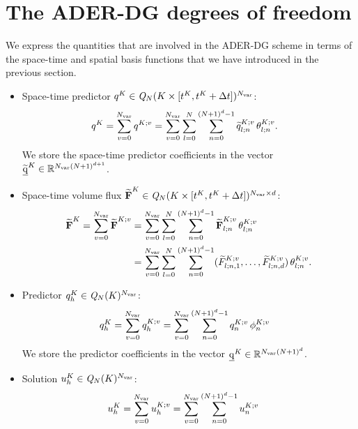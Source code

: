 \documentclass{scrreprt}
\theoremstyle{definition}
\theoremstyle{nonumberplain}
\renewcommand{\vec}[1]{{\textbf{#1}}}
\newcommand{\stvec}[1]{\widetilde{\vec{#1}}}
\newcommand{\laVec}[1]{\underline{\mathrm{#1}}}
\newcommand{\cell}{K}
\newcommand{\polyspace}[3]{\mathit{#1}_{#2}(#3)}
\begin{document}
\section{The ADER-DG degrees of freedom}
We express the quantities
that are involved in the
ADER-DG scheme in terms of
the space-time and spatial basis
functions that we have introduced in
the previous section.
\begin{itemize}
  \item Space-time predictor
  $q^\cell\in\polyspace{Q}{N}{\cell\times[t^\cell,t^\cell+\Delta
  t]}^{N_\textup{var}}$:
  \begin{align*}
q^{\cell}
&=
\sum_{v=0}^{N_\textup{var}}
q^{\cell;v}
=
\sum_{v=0}^{N_\textup{var}}
\sum_{l=0}^{N}
\sum_{n=0}^{(N+1)^{d}-1}
\widetilde{q}^{\cell;v}_{l;n}\,
\theta^{\cell;v}_{l;n}.
\end{align*}
We store the space-time predictor coefficients in the vector
$\laVec{\widetilde{q}}^\cell\in\mathbb{R}^{N_\textup{var}(N+1)^{d+1}}$.
\item Space-time volume flux
$\stvec{F}^{\cell}\in\polyspace{Q}{N}{\cell\times[t^\cell,t^\cell+\Delta
t]}^{N_\textup{var}\times d}$:
\begin{align*}
\stvec{F}^\cell
=
\sum_{v=0}^{N_\textup{var}}
\stvec{F}^{K;v}
&=
\sum_{v=0}^{N_\textup{var}}
\sum_{l=0}^{N}
\sum_{n=0}^{(N+1)^d-1}
\stvec{F}^{K;v}_{l;n}\,{\theta}^{K;v}_{l;n} \\
&=
\sum_{v=0}^{N_\textup{var}}
\sum_{l=0}^{N}
\sum_{n=0}^{(N+1)^d-1}
(\widetilde{F}^{K;v}_{l;n,1},\ldots,\widetilde{F}^{K;v}_{l;n,d})\,{\theta}^{K;v}_{l;n}.
\end{align*}
\item Predictor $q_h^{\cell}\in\polyspace{Q}{N}{\cell}^{N_\textup{var}}$:
\begin{align*}
q_h^{\cell}
&=
\sum_{v=0}^{N_\textup{var}}
q_h^{\cell;v}
=
\sum_{v=0}^{N_\textup{var}}
\sum_{n=0}^{(N+1)^{d}-1}
q^{\cell;v}_{n}\,
\phi^{\cell;v}_{n}
\end{align*}
We store the predictor coefficients in the vector
$\laVec{q}^\cell\in\mathbb{R}^{N_\textup{var}(N+1)^{d}}$.
\item Solution $u_h^{\cell}\in\polyspace{Q}{N}{\cell}^{N_\textup{var}}$:
\begin{align*}
u_h^{\cell}
&=
\sum_{v=0}^{N_\textup{var}}
u_h^{\cell;v}
=
\sum_{v=0}^{N_\textup{var}}
\sum_{n=0}^{(N+1)^{d}-1}
u^{\cell;v}_{n}\,

\end{align*}
\end{itemize}
\end{document}
